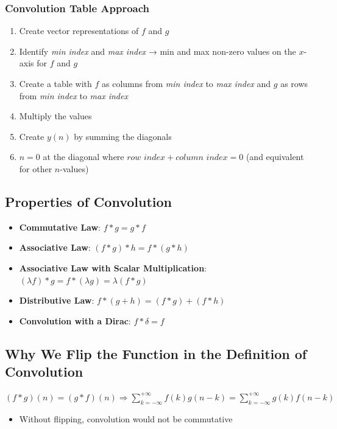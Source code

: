\subsubsection{Convolution Table Approach}
\begin{enumerate}
  \item Create vector representations of $f$ and $g$
  \item Identify \textit{min index} and \textit{max index} → min and max non-zero values on the $x$-axis for $f$ and $g$
  \item Create a table with $f$ as columns from \textit{min index} to \textit{max index} and $g$ as rows from \textit{min index} to \textit{max index}
  \item Multiply the values
  \item Create $y(n)$ by summing the diagonals
  \item $n = 0$ at the diagonal where $\textit{row index} + \textit{column index} = 0$ (and equivalent for other $n$-values)
\end{enumerate}

\subsection{Properties of Convolution}
\begin{itemize}
  \item \textbf{Commutative Law}: $f * g = g * f$
  \item \textbf{Associative Law}: $(f * g) * h = f * (g * h)$
  \item \textbf{Associative Law with Scalar Multiplication}: $(\lambda f) * g = f * (\lambda g) = \lambda (f * g)$
  \item \textbf{Distributive Law}: $f * (g+h) = (f * g) + (f * h)$
  \item \textbf{Convolution with a Dirac}: $f * \delta = f$
\end{itemize}

\subsection{Why We Flip the Function in the Definition of Convolution}
$(f * g)(n) = (g * f)(n) \Rightarrow \sum_{k = -\infty}^{+\infty} f(k) g(n-k) = \sum_{k = -\infty}^{+\infty} g(k) f(n-k)$

\begin{itemize}
  \item Without flipping, convolution would not be commutative
\end{itemize}

